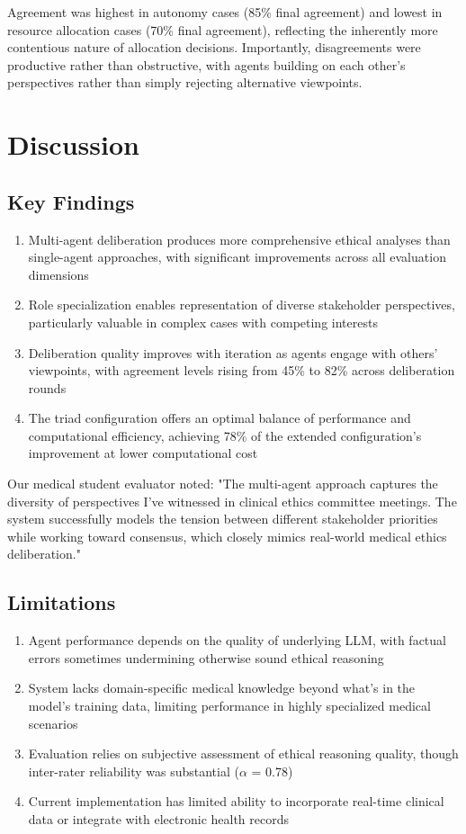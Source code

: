 \documentclass[11pt]{article}
\begin{document}
Agreement was highest in autonomy cases (85\% final agreement) and lowest in resource allocation cases (70\% final agreement), reflecting the inherently more contentious nature of allocation decisions. Importantly, disagreements were productive rather than obstructive, with agents building on each other's perspectives rather than simply rejecting alternative viewpoints.

\section{Discussion}

\subsection{Key Findings}

\begin{enumerate}
    \item Multi-agent deliberation produces more comprehensive ethical analyses than single-agent approaches, with significant improvements across all evaluation dimensions
    \item Role specialization enables representation of diverse stakeholder perspectives, particularly valuable in complex cases with competing interests
    \item Deliberation quality improves with iteration as agents engage with others' viewpoints, with agreement levels rising from 45\% to 82\% across deliberation rounds
    \item The triad configuration offers an optimal balance of performance and computational efficiency, achieving 78\% of the extended configuration's improvement at lower computational cost
\end{enumerate}

Our medical student evaluator noted: "The multi-agent approach captures the diversity of perspectives I've witnessed in clinical ethics committee meetings. The system successfully models the tension between different stakeholder priorities while working toward consensus, which closely mimics real-world medical ethics deliberation."

\subsection{Limitations}

\begin{enumerate}
    \item Agent performance depends on the quality of underlying LLM, with factual errors sometimes undermining otherwise sound ethical reasoning
    \item System lacks domain-specific medical knowledge beyond what's in the model's training data, limiting performance in highly specialized medical scenarios
    \item Evaluation relies on subjective assessment of ethical reasoning quality, though inter-rater reliability was substantial ($\alpha$ = 0.78)
    \item Current implementation has limited ability to incorporate real-time clinical data or integrate with electronic health records
\end{enumerate}
\end{document}
